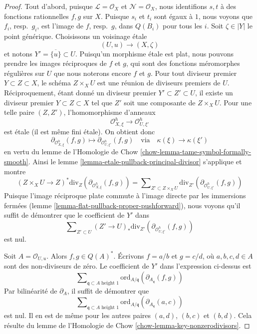 \begin{proof}
\medskip\noindent
Tout d'abord, puisque $\mathcal{L} = \mathcal{O}_X$ et $\mathcal{N} =
\mathcal{O}_X$, nous identifions $s, t$ à des
fonctions rationnelles $f, g$ sur $X$. Puisque $s_i$ et $t_i$ sont égaux à
$1$, nous voyons que $f_i$, resp.\ $g_i$, est l'image de $f$, resp.\ $g$, dans
$Q(B_i)$ pour tous les $i$. Soit $\zeta \in |Y|$ le point générique.
Choisissons un voisinage \'etale
$$
(U, u) \longrightarrow (X, \zeta)
$$
et notons $Y' = \overline{\{u\}} \subset U$. Puisqu'un morphisme \'etale
est plat, nous pouvons prendre les images réciproques de $f$ et $g$, qui sont des fonctions méromorphes
régulières sur $U$ que nous noterons encore $f$ et $g$. Pour tout
diviseur premier $Y \subset Z \subset X$, le schéma $Z \times_X U$ est une
réunion de diviseurs premiers de $U$. Réciproquement, étant donné un diviseur
premier $Y' \subset Z' \subset U$, il existe un diviseur premier $Y \subset Z
\subset X$ tel que $Z'$ soit une composante de $Z \times_X U$. Pour une
telle paire $(Z, Z')$, l'homomorphisme d'anneaux
$$
\mathcal{O}_{X, \xi}^h \to \mathcal{O}_{U, \xi'}^h
$$
est \'etale (il est même fini \'etale). On obtient donc
$$
\partial_{\mathcal{O}_{X, \xi}^h}(f, g) \mapsto
\partial_{\mathcal{O}_{U, \xi'}^h}(f, g)
\quad\text{via}\quad
\kappa(\xi) \to \kappa(\xi')
$$
en vertu du lemme de l'Homologie de Chow \ref{chow-lemma-tame-symbol-formally-smooth}. Ainsi
le lemme \ref{lemma-etale-pullback-principal-divisor} s'applique et montre
$$
(Z \times_X U \to Z)^*\text{div}_Z(\partial_{\mathcal{O}_{X, \xi}^h}(f, g))
=
\sum\nolimits_{Z' \subset Z \times_X U}
\text{div}_{Z'}(\partial_{\mathcal{O}_{U, \xi'}^h}(f, g))
$$
Puisque l'image réciproque plate commute à l'image directe par les immersions
fermées (lemme \ref{lemma-flat-pullback-proper-pushforward}), nous voyons
qu'il suffit de démontrer que le coefficient de $Y'$ dans
$$
\sum\nolimits_{Z' \subset U} 
(Z' \to U)_*\text{div}_{Z'}(\partial_{\mathcal{O}_{U, \xi'}^h}(f, g))
$$
est nul.

\medskip\noindent
Soit $A = \mathcal{O}_{U, u}$. Alors $f, g \in Q(A)^*$. Écrivons
$f = a/b$ et $g = c/d$, où $a, b, c, d \in A$ sont des non-diviseurs de zéro.
Le coefficient de $Y'$ dans l'expression ci-dessus est
$$
\sum\nolimits_{\mathfrak q \subset A\text{ height }1}
\text{ord}_{A/\mathfrak q}(\partial_{A_\mathfrak q}(f, g))
$$
Par bilinéarité de $\partial_A$, il suffit de démontrer que
$$
\sum\nolimits_{\mathfrak q \subset A\text{ height }1}
\text{ord}_{A/\mathfrak q}(\partial_{A_\mathfrak q}(a, c))
$$
est nul. Il en est de même pour les autres paires $(a, d)$, $(b, c)$ et $(b, d)$. Cela
résulte du lemme de l'Homologie de Chow \ref{chow-lemma-key-nonzerodivisors}.
\end{proof}











